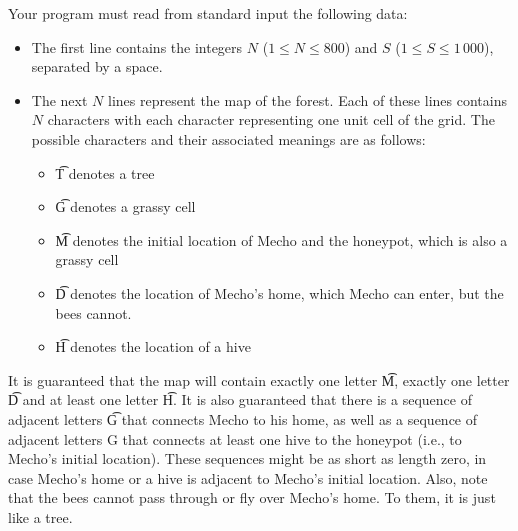 Your program must read from standard input the following data:
\begin{itemize}
\item The first line contains the integers $N$ ($1 \le N \le 800$) and $S$ ($1 \le S \le 1\,000$), separated by a space.
\item The next $N$ lines represent the map of the forest. Each of these lines contains $N$ characters with each character representing one unit cell of the grid. The possible characters and their associated meanings are as follows:
\begin{itemize}
\item \t{T} denotes a tree
\item \t{G} denotes a grassy cell
\item \t{M} denotes the initial location of Mecho and the honeypot, which is also a grassy cell
\item\t{D} denotes the location of Mecho's home, which Mecho can enter, but the bees cannot.
\item\t{H} denotes the location of a hive
\end{itemize}
\end{itemize}
It is guaranteed that the map will contain exactly one letter \t{M}, exactly one letter \t{D} and at least one letter \t{H}. It is also guaranteed that there is a sequence of adjacent letters \t{G} that connects Mecho to his home, as well as a sequence of adjacent letters G that connects at least one hive to the honeypot (i.e., to Mecho's initial location). These sequences might be as short as length zero, in case Mecho's home or a hive is adjacent to Mecho's initial location. Also, note that the bees cannot pass through or fly over Mecho's home. To them, it is just like a tree.
